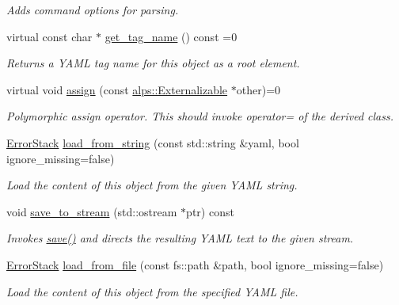 \begin{DoxyCompactItemize}
\begin{DoxyCompactList}\small\item\em Adds command options for parsing. \end{DoxyCompactList}\item 
virtual const char $\ast$ \hyperlink{structalps_1_1Externalizable_a865f0f3245014aafdd3133cc9d912cc5}{get\+\_\+tag\+\_\+name} () const =0
\begin{DoxyCompactList}\small\item\em Returns a Y\+A\+ML tag name for this object as a root element. \end{DoxyCompactList}\item 
virtual void \hyperlink{structalps_1_1Externalizable_a5c289543724fdeff9b260f0d0db90f79}{assign} (const \hyperlink{structalps_1_1Externalizable}{alps\+::\+Externalizable} $\ast$other)=0
\begin{DoxyCompactList}\small\item\em Polymorphic assign operator. This should invoke operator= of the derived class. \end{DoxyCompactList}\item 
\hyperlink{classalps_1_1ErrorStack}{Error\+Stack} \hyperlink{structalps_1_1Externalizable_a3841c50c774b365f37d5adffd73d9951}{load\+\_\+from\+\_\+string} (const std\+::string \&yaml, bool ignore\+\_\+missing=false)
\begin{DoxyCompactList}\small\item\em Load the content of this object from the given Y\+A\+ML string. \end{DoxyCompactList}\item 
void \hyperlink{structalps_1_1Externalizable_abba9ffdd2e669137e214e5a499860b04}{save\+\_\+to\+\_\+stream} (std\+::ostream $\ast$ptr) const 
\begin{DoxyCompactList}\small\item\em Invokes \hyperlink{structalps_1_1Externalizable_a17a3cdc895ad343d18fd37ff6efd0aef}{save()} and directs the resulting Y\+A\+ML text to the given stream. \end{DoxyCompactList}\item 
\hyperlink{classalps_1_1ErrorStack}{Error\+Stack} \hyperlink{structalps_1_1Externalizable_a5793ccfb5fd521a3eb8dbde9764c1564}{load\+\_\+from\+\_\+file} (const fs\+::path \&path, bool ignore\+\_\+missing=false)
\begin{DoxyCompactList}\small\item\em Load the content of this object from the specified Y\+A\+ML file. \end{DoxyCompactList}\item 

\end{DoxyCompactItemize}
